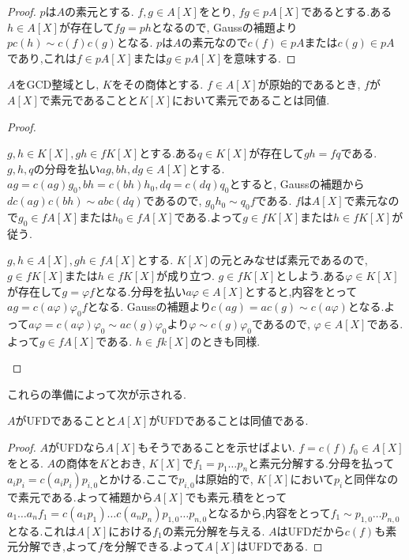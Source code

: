 \begin{proof}
	$p$は$A$の素元とする. $f,g\in A[X]$をとり, $fg\in pA[X]$であるとする.ある$h\in A[X]$が存在して$fg=ph$となるので, Gaussの補題より$pc(h)\sim c(f)c(g)$となる. $p$は$A$の素元なので$c(f)\in pA$または$c(g)\in pA$であり,これは$f\in pA[X]$または$g\in pA[X]$を意味する.
\end{proof}

\begin{lem}
	$A$をGCD整域とし, $K$をその商体とする. $f\in A[X]$が原始的であるとき, $f$が$A[X]$で素元であることと$K[X]$において素元であることは同値.
\end{lem}
\begin{proof}
	\begin{eqv}
		\item $g,h\in K[X], gh\in fK[X]$とする.ある$q\in K[X]$が存在して$gh=fq$である. $g,h,q$の分母を払い$ag,bh,dg\in A[X]$とする. $ag=c(ag)g_0,bh=c(bh)h_0,dq=c(dq)q_0$とすると, Gaussの補題から$d c(ag)c(bh)\sim ab c(dq)$であるので, $g_0h_0\sim q_0f$である. $f$は$A[X]$で素元なので$g_0\in fA[X]$または$h_0\in fA[X]$である.よって$g\in fK[X]$または$h\in fK[X]$が従う.
		
		\item $g,h\in A[X], gh\in fA[X]$とする. $K[X]$の元とみなせば素元であるので, $g\in fK[X]$または$h\in fK[X]$が成り立つ. $g\in fK[X]$としよう.ある$\varphi\in K[X]$が存在して$g=\varphi f$となる.分母を払い$a\varphi\in A[X]$とすると,内容をとって$ag=c(a\varphi)\varphi_0f$となる. Gaussの補題より$c(ag)=ac(g)\sim c(a\varphi)$となる.よって$a\varphi=c(a\varphi)\varphi_0\sim ac(g)\varphi_0$より$\varphi\sim c(g)\varphi_0$であるので, $\varphi\in A[X]$である.よって$g\in fA[X]$である. $h\in fk[X]$のときも同様.
	\end{eqv}
\end{proof}

これらの準備によって次が示される.

\begin{thm}
	$A$がUFDであることと$A[X]$がUFDであることは同値である.
\end{thm}

\begin{proof}
	$A$がUFDなら$A[X]$もそうであることを示せばよい. $f=c(f)f_0\in A[X]$をとる. $A$の商体を$K$とおき, $K[X]$で$f_1=p_1\dots p_n$と素元分解する.分母を払って$a_ip_i=c(a_ip_i)p_{i,0}$とかける.ここで$p_{i,0}$は原始的で, $K[X]$において$p_i$と同伴なので素元である.よって補題から$A[X]$でも素元.積をとって$a_1\dots a_n f_1=c(a_1p_1)\dots c(a_np_n)p_{1,0}\dots p_{n,0}$となるから,内容をとって$f_1\sim p_{1,0}\dots p_{n,0}$となる.これは$A[X]$における$f_1$の素元分解を与える. $A$はUFDだから$c(f)$も素元分解でき,よって$f$を分解できる.よって$A[X]$はUFDである.
\end{proof}

